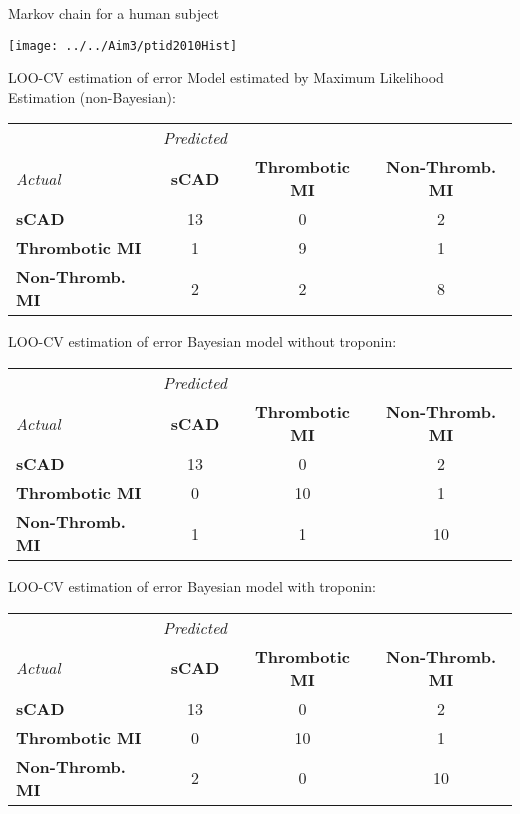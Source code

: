 \documentclass[xcolor=dvipsnames]{beamer}
\begin{document}
\begin{frame}{Markov chain for a human subject}
	\vspace{-7pt}
	\begin{center}
		\texttt{[image: ../../Aim3/ptid2010Hist]}
	\end{center}
\end{frame}

\begin{frame}{LOO-CV estimation of error}
	\vspace{-15pt}
	Model estimated by Maximum Likelihood Estimation (non-Bayesian):
	\vspace{4ex}
	
	\begin{tabular}{l|ccc}
		& \emph{Predicted} & & \\
		\emph{Actual}  & \textbf{sCAD} & \textbf{Thrombotic MI} & \textbf{Non-Thromb. MI} \\
		\hline
		\textbf{sCAD} & 13 &  0 & 2\\
		\textbf{Thrombotic MI} &   1 & 9 &  1\\
		\textbf{Non-Thromb. MI}  & 2  & 2 & 8 
	\end{tabular}
\end{frame}

\begin{frame}{LOO-CV estimation of error}
	\vspace{-15pt}
	Bayesian model without troponin:
	\vspace{4ex}

\begin{tabular}{l|ccc}
	& \emph{Predicted} & & \\
	\emph{Actual} &  \textbf{sCAD} & \textbf{Thrombotic MI} & \textbf{Non-Thromb. MI} \\
	\hline
	\textbf{sCAD}   &     13    &     0    &     2\\
	\textbf{Thrombotic MI}  &  0    &    10    &     1\\
	\textbf{Non-Thromb. MI} &   1    &     1   &     10
\end{tabular}
\end{frame}

\begin{frame}{LOO-CV estimation of error}
	\vspace{-15pt}
	Bayesian model with troponin:
	\vspace{4ex}
	
\begin{tabular}{l|ccc}
	& \emph{Predicted} & & \\
	\emph{Actual}  &     \textbf{sCAD} & \textbf{Thrombotic MI} & \textbf{Non-Thromb. MI} \\
	\hline
	\textbf{sCAD}   &     13    &     0    &     2\\
	\textbf{Thrombotic MI}  &  0    &    10    &     1\\
	\textbf{Non-Thromb. MI} &   2  &   0 &    10
\end{tabular}
\end{frame}
\end{document}
